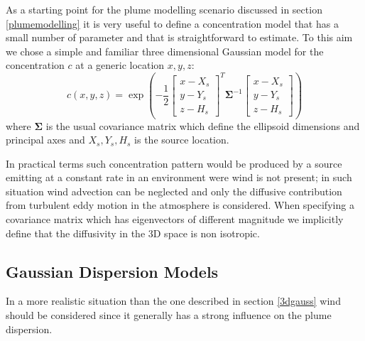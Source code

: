 \documentclass[a4paper,11pt]{report}
\begin{document}
As a starting point for the plume modelling scenario discussed in section \ref{plumemodelling} it is very useful to define a concentration model that has a small number of parameter and that is straightforward to estimate. 
To this aim we chose a simple and familiar three dimensional Gaussian model for the concentration $c$ at a generic location $x,y,z$:
\begin{equation}\label{eqn:singlesourcegaussian}
c(x,y,z) = %
\exp\left(-\frac{1}{2}
\left[\begin{array}{c}
x-X_s\\
y-Y_s\\
z-H_s
\end{array} \right]^T{\boldsymbol\Sigma}^{-1}
\left[\begin{array}{c}
x-X_s\\
y-Y_s\\
z-H_s
\end{array} \right]
\right)
\end{equation}
where $\boldsymbol\Sigma$ is the usual covariance matrix which define the ellipsoid dimensions and principal axes and $X_s,Y_s,H_s$ is the source location.

In practical terms such concentration pattern would be produced by a source emitting at a constant rate in an environment were wind is not present; in such situation wind advection can be neglected and only the diffusive contribution from turbulent eddy motion in the atmosphere is considered. When specifying a covariance matrix which has eigenvectors of different magnitude we implicitly define that the diffusivity in the 3D space is non isotropic.

\subsection{Gaussian Dispersion Models}

In a more realistic situation than the one described in section \ref{3dgauss} wind should be considered since it generally has a strong influence on the plume dispersion.  
\end{document}
